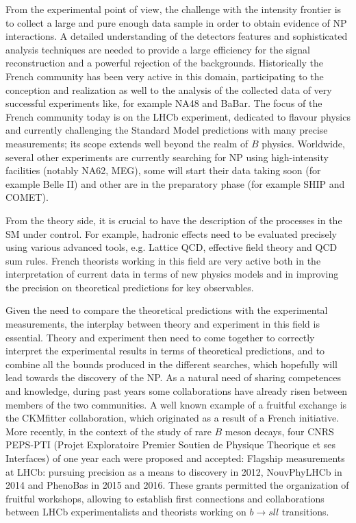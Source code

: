 From the experimental point of view, the challenge with the intensity frontier is to collect a large and pure enough data sample in order to obtain evidence of NP interactions. A detailed understanding of the detectors features and sophisticated analysis techniques are needed to provide a large efficiency for the signal reconstruction and a powerful rejection of the backgrounds.  Historically the French community has been very active in this domain, participating to the conception and realization as well to the analysis of the collected data of very successful experiments like, for example NA48 and BaBar.  The focus of the French community today is on the  LHCb experiment, dedicated to flavour physics and currently challenging the Standard Model predictions with many precise measurements; its scope extends well beyond the realm of $B$ physics. Worldwide, several other experiments are currently searching for NP using high-intensity facilities (notably NA62, MEG),  some will start their data taking soon (for example Belle II) and other are in the preparatory phase (for example SHIP and COMET). 

From the theory side, it is crucial to have the description of the processes in the SM under control. For example, hadronic effects need to be evaluated precisely using various advanced tools, e.g. Lattice QCD, effective field theory and QCD sum rules. French theorists working in this field are very active both in the interpretation of current data in terms of new physics models and in improving the precision on theoretical  predictions for key observables. 

Given the need to compare the theoretical predictions with the experimental measurements, the interplay between theory and experiment in this field is essential. Theory and experiment then need to come together to correctly interpret the experimental results in terms of theoretical predictions, and to combine all the bounds produced in the different searches, which hopefully  will lead towards the discovery of the NP. 
 As a natural need of sharing competences and knowledge, during past years some collaborations have already risen between members of the two communities. A well known example of a fruitful exchange is the CKMfitter collaboration, which originated as a result of a French initiative. More recently, in the context of the study of rare $B$ meson decays, four  CNRS PEPS-PTI (Projet Exploratoire Premier Soutien de Physique Theorique et ses Interfaces) of one year each were proposed and accepted: Flagship measurements at LHCb: pursuing precision as a means to discovery in 2012, NouvPhyLHCb in 2014 and PhenoBas in 2015 and 2016. These grants permitted the organization of  fruitful workshops,  allowing to establish first connections and collaborations between LHCb experimentalists and theorists  working on $b \to sll$ transitions. 

